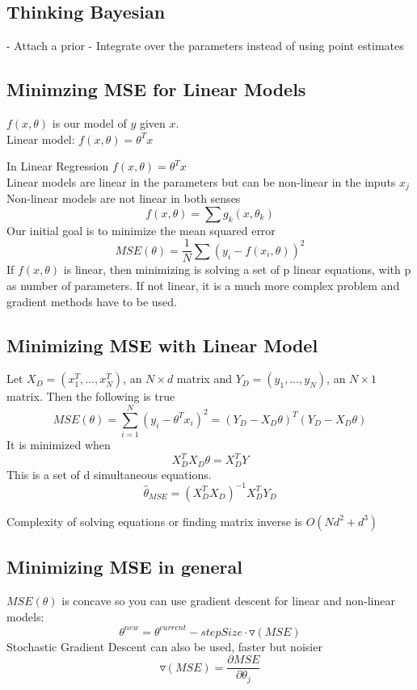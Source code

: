 \documentclass[11pt,psfig]{article}
\begin{document}
\setlength{\parskip}{1.2ex plus0.3ex minus 0.3ex}


\vfill\eject

\subsection*{Thinking Bayesian}

- Attach a prior
- Integrate over the parameters instead of using point estimates

\subsection*{Minimzing MSE for Linear Models}

$f(x,\theta)$ 	is our model of $y$ given $x$.\\

Linear model: $f(x,\theta)=\theta^T x$

In Linear Regression $f(x,\theta)=\theta^T x$\\
Linear models are linear in the parameters but can be non-linear in the inputs $x_j$\\
Non-linear models are not linear in both senses
\[
f(x,\theta)=\sum{g_k(x,\theta_k)}
\]
Our initial goal is to minimize the mean squared error
\[
MSE(\theta) = \frac{1}{N} \sum{ (y_i-f(x_i,\theta))^2 }
\]
If $f(x,\theta)$ is linear, then minimizing is solving a set of p linear equations, with p as number of parameters. If not linear, it is a much more complex problem and gradient methods have to be used. 

\subsection*{Minimizing MSE with Linear Model}

Let $X_D=(x_1^T,...,x_N^T)$, an $N \times d$ matrix and $Y_D=(y_1,...,y_N)$, an $N \times 1$ matrix.
Then the following is true
\[
MSE(\theta) = \sum_{i=1}^N{(y_i-\theta^T x_i)^2} = (Y_D-X_D\theta)^T(Y_D-X_D\theta)
\]
It is minimized when
\[
X_D^T X_D \theta = X_D^T Y
\]
This is a set of d simultaneous equations.
\[
\hat{\theta}_{MSE} = (X_D^T X_D)^{-1} X_D^T Y_D
\]

Complexity of solving equations or finding matrix inverse is $O(N d^2 + d^3)$

\subsection*{Minimizing MSE in general}
$MSE(\theta)$ is concave so you can use gradient descent for linear and non-linear models:
     \[
		\theta^{new} = \theta^{current} - stepSize\cdot \triangledown(MSE)
		\]
Stochastic Gradient Descent can also be used, faster but noisier
\[
\triangledown(MSE) = \frac{\partial MSE}{\partial \theta_j}
\]
\end{document}
